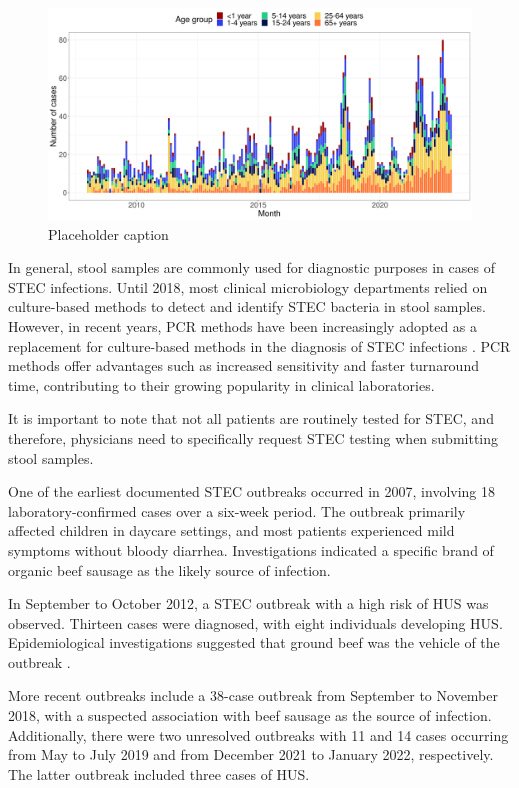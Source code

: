 \documentclass[a4paper,twoside,11pt]{report} %
\theoremstyle{definition}
\theoremstyle{definition}
\theoremstyle{definition}
\theoremstyle{definition}
\theoremstyle{remark}
\begin{document}
\begin{figure}[H]
\includegraphics[width=1\linewidth]{../figures/STEC_long_plot} \caption{Placeholder caption}\label{fig:STECLongPlot}
\end{figure}

In general, stool samples are commonly used for diagnostic purposes in cases of STEC infections. Until 2018, most clinical microbiology departments relied on culture-based methods to detect and identify STEC bacteria in stool samples. However, in recent years, PCR methods have been increasingly adopted as a replacement for culture-based methods in the diagnosis of STEC infections \autocite{Svendsen_2023}. PCR methods offer advantages such as increased sensitivity and faster turnaround time, contributing to their growing popularity in clinical laboratories.

It is important to note that not all patients are routinely tested for STEC, and therefore, physicians need to specifically request STEC testing when submitting stool samples.

One of the earliest documented STEC outbreaks occurred in 2007, involving 18 laboratory-confirmed cases over a six-week period. The outbreak primarily affected children in daycare settings, and most patients experienced mild symptoms without bloody diarrhea. Investigations indicated a specific brand of organic beef sausage as the likely source of infection.

In September to October 2012, a STEC outbreak with a high risk of HUS was observed. Thirteen cases were diagnosed, with eight individuals developing HUS. Epidemiological investigations suggested that ground beef was the vehicle of the outbreak \autocite{Soborg_2013}.

More recent outbreaks include a 38-case outbreak from September to November 2018, with a suspected association with beef sausage as the source of infection. Additionally, there were two unresolved outbreaks with 11 and 14 cases occurring from May to July 2019 and from December 2021 to January 2022, respectively. The latter outbreak included three cases of HUS.
\end{document}
